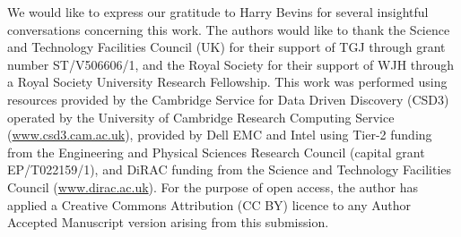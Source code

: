 \documentclass[twocolumn,english,aps,prl,amsmath,amssymb,reprint,footinbib,floatfix,showkeys]{revtex4-2}
\begin{document}
\begin{acknowledgments}
We would like to express our gratitude to Harry Bevins for several insightful conversations concerning this work. 
The authors would like to thank the Science and Technology Facilities Council (UK) for their support of TGJ through grant number ST/V506606/1, and the Royal Society for their support of WJH  through a Royal Society University Research Fellowship. 
This work was performed using resources provided by the Cambridge Service for Data Driven Discovery (CSD3) operated by the University of Cambridge Research Computing Service (\href{www.csd3.cam.ac.uk}{www.csd3.cam.ac.uk}), provided by Dell EMC and Intel using Tier-2 funding from the Engineering and Physical Sciences Research Council (capital grant EP/T022159/1), and DiRAC funding from the Science and Technology Facilities Council (\href{www.dirac.ac.uk}{www.dirac.ac.uk}).
For the purpose of open access, the author has applied a Creative Commons Attribution (CC BY) licence to any Author Accepted Manuscript version arising from this submission.
\end{acknowledgments}



\end{document}
